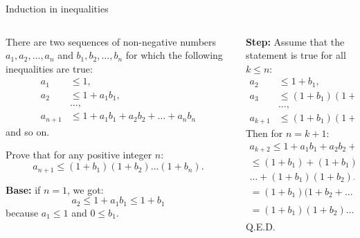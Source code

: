 \documentclass[9pt,aspectratio=169]{beamer}
\begin{document}
\begin{frame}{Induction in inequalities}
  \begin{columns}[T]
    \begin{column}{0.5\textwidth}
      \begin{problem}
        There are two sequences of non-negative numbers $a_1, a_2, \dots, a_n$ and $b_1, b_2, \dots, b_n$ for which the following inequalities are true:
        \begin{align*}
          a_{1}&\leq1,\\ 
          a_{2}&\leq1+a_{1}b_{1},\\ 
          &\ldots,\\
          a_{n+1}&\leq1+a_{1}b_{1}+a_{2}b_{2}+\ldots +a_{n}b_{n}
        \end{align*}
        and so on.
        
        Prove that for any positive integer $n$:
        \[
          a_{n+1}\leq(1+b_{1})(1+b_{2})\ldots (1+b_{n}).
        \]
      \end{problem}\pause

      \textbf{Base:} if $n=1$, we got: 
      \[
        a_{2}\leq1+a_{1}b_{1}\leq1+b_{1}
      \] because $a_{1}\leq1$ and $0\leq b_{1}$.\pause
    \end{column}
    \begin{column}{0.5\textwidth}
      \textbf{Step:} Assume that the statement is true for all $k \leq n$:
      \begin{align*}
        a_{2}&\leq1+b_{1},\\ 
        a_{3}&\leq(1+b_{1})(1+b_{2}),\\
         &\ldots,\\ 
        a_{k+1}&\leq(1+b_{1})(1+b_{2})\ldots (1+b_{k}).
      \end{align*}\pause
      Then for $n = k+1$:
      \begin{multline*}
        a_{k+2}\leq1+a_{1}b_{1}+a_{2}b_{2}+\ldots +a_{k+1}b_{k+1}\leq\\
        \leq(1+b_{1})+(1+b_{1})b_{2}+\ldots\\ 
        \ldots +(1+b_{1})(1+b_{2})\ldots (1+b_{k})b_{k+1}=\\
        = (1 + b_1)\bigl(1 + b_2 + \ldots + (1+b_{2})\ldots (1+b_{k})b_{k+1}\bigr) =\\
        =(1+b_{1})(1+b_{2})\ldots (1+b_{k+1}).
      \end{multline*}
      \hfill Q.E.D.
    \end{column}
  \end{columns}
\end{frame}
\end{document}
